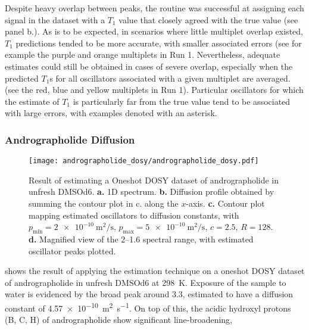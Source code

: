 Despite heavy overlap between peaks, the routine was successful at
assigning each signal in the dataset with a $T_1$ value that closely agreed
with the true value (see panel b.). As is to be expected, in scenarios where
little multiplet
overlap existed, $T_1$ predictions tended to be more accurate, with smaller
associated errors (see for example the purple and orange multiplets in Run 1.
Nevertheless, adequate estimates could still be obtained in cases of severe
overlap, especially when the predicted $T_1$s for all oscillators associated
with a given multiplet are averaged. (see the red, blue and yellow multiplets
in Run 1). Particular oscillators for which the estimate of $T_1$ is
particularly far from the true value tend to be associated with large errors,
with examples denoted with an asterisk.

\subsubsection{Andrographolide Diffusion}
\begin{sidewaysfigure}
    \centering
    \texttt{[image: andrographolide\_dosy/andrographolide\_dosy.pdf]}
    \caption[
        Result of estimating a Oneshot \acs{DOSY} dataset of andrographolide.
    ]{
        Result of estimating a Oneshot \ac{DOSY} dataset of andrographolide in
        unfresh \ac{DMSOd6}.
        \textbf{a.} \ac{1D} spectrum.
        \textbf{b.} Diffusion profile obtained by summing the contour plot in
        c. along the $x$-axis.
        \textbf{c.} Contour plot mapping estimated oscillators to diffusion constants, with
        $p_{\text{min}} = \qty{2e-10}{\meter\squared\per\second}$,
        $p_{\text{max}} = \qty{5e-10}{\meter\squared\per\second}$,
        $c = 2.5$,
        $R=128$.
        \textbf{d.} Magnified view of the \SIrange{2}{1.6}{\partspermillion}
        spectral range, with estimated oscillator peaks plotted.
    }
    \label{fig:andrographolide-dosy}
\end{sidewaysfigure}
 shows the result of applying the
estimation technique on a oneshot \ac{DOSY} dataset of andrographolide in
unfresh \acs{DMSOd6} at \qty{298}{\kelvin}. Exposure of the sample to water is
evidenced by the broad
peak around \qty{3.3}{\partspermillion}, estimated to have a diffusion constant
of \qty{4.57e-10}{\meter\squared\per\second}. On top of this, the acidic
hydroxyl protons (B, C, H) of andrographolide show significant line-broadening,
